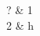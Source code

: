 \documentclass{article}
\begin{document}
\begin{fmv}{2}{2}
? & 1 \\
2 & h \\
\end{fmv}
\end{document}
